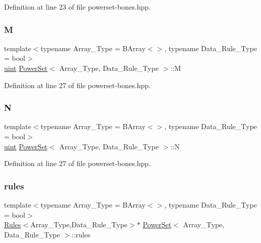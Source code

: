 Definition at line 23 of file powerset-\/bones.\+hpp.

\mbox{\label{class_power_set_a91d328d5ace1ed6a8587a66af905ae98}} 
\subsubsection{\texorpdfstring{M}{M}}
{\footnotesize\ttfamily template$<$typename Array\+\_\+\+Type  = B\+Array$<$$>$, typename Data\+\_\+\+Rule\+\_\+\+Type  = bool$>$ \\
\hyperlink{typedefs_8hpp_a91ad9478d81a7aaf2593e8d9c3d06a14}{uint} \hyperlink{class_power_set}{Power\+Set}$<$ Array\+\_\+\+Type, Data\+\_\+\+Rule\+\_\+\+Type $>$\+::M}



Definition at line 27 of file powerset-\/bones.\+hpp.

\mbox{\label{class_power_set_ab3b65c1b9bce012f4aabe5acae093acd}} 
\subsubsection{\texorpdfstring{N}{N}}
{\footnotesize\ttfamily template$<$typename Array\+\_\+\+Type  = B\+Array$<$$>$, typename Data\+\_\+\+Rule\+\_\+\+Type  = bool$>$ \\
\hyperlink{typedefs_8hpp_a91ad9478d81a7aaf2593e8d9c3d06a14}{uint} \hyperlink{class_power_set}{Power\+Set}$<$ Array\+\_\+\+Type, Data\+\_\+\+Rule\+\_\+\+Type $>$\+::N}



Definition at line 27 of file powerset-\/bones.\+hpp.

\mbox{\label{class_power_set_afa542ecc31858c8644d1e76078eb1713}} 
\subsubsection{\texorpdfstring{rules}{rules}}
{\footnotesize\ttfamily template$<$typename Array\+\_\+\+Type  = B\+Array$<$$>$, typename Data\+\_\+\+Rule\+\_\+\+Type  = bool$>$ \\
\hyperlink{class_rules}{Rules}$<$Array\+\_\+\+Type,Data\+\_\+\+Rule\+\_\+\+Type$>$$\ast$ \hyperlink{class_power_set}{Power\+Set}$<$ Array\+\_\+\+Type, Data\+\_\+\+Rule\+\_\+\+Type $>$\+::rules}




